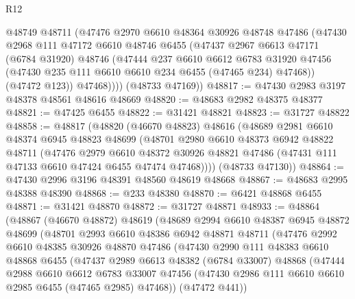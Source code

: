 \begin{lexlean}{R12}
\begin{coremodule}
          @48749
          @48711
          (@47476
            @2970
            @6610
            @48364
            @30926
            @48748
            @47486
            (@47430
              @2968
              @111
              @47172
              @6610
              @48746
              @6455
              (@47437
                @2967
                @6613
                @47171
                (@6784 @31920)
                @48746
                (@47444
                  @237
                  @6610
                  @6612
                  @6783
                  @31920
                  @47456
                  (@47430 @235 @111 @6610 @6610 @234 @6455 (@47465 @234) @47468))
                (@47472 @123))
              @47468))))
      (@48733 @47169))
@48817 := @47430 @2983 @3197 @48378 @48561 @48616 @48669
@48820 := @48683 @2982 @48375 @48377
@48821 := @47425 @6455
@48822 := @31421 @48821
@48823 := @31727 @48822
@48858 := @48817
    (@48820
      (@46670 @48823)
      @48616
      (@48689
        @2981
        @6610
        @48374
        @6945
        @48823
        @48699
        (@48701
          @2980
          @6610
          @48373
          @6942
          @48822
          @48711
          (@47476
            @2979
            @6610
            @48372
            @30926
            @48821
            @47486
            (@47431 @111 @47133 @6610 @47424 @6455 @47474 @47468))))
      (@48733 @47130))
@48864 := @47430 @2996 @3196 @48391 @48560 @48619 @48668
@48867 := @48683 @2995 @48388 @48390
@48868 := @233 @48380
@48870 := @6421 @48868 @6455
@48871 := @31421 @48870
@48872 := @31727 @48871
@48933 := @48864
    (@48867
      (@46670 @48872)
      @48619
      (@48689
        @2994
        @6610
        @48387
        @6945
        @48872
        @48699
        (@48701
          @2993
          @6610
          @48386
          @6942
          @48871
          @48711
          (@47476
            @2992
            @6610
            @48385
            @30926
            @48870
            @47486
            (@47430
              @2990
              @111
              @48383
              @6610
              @48868
              @6455
              (@47437
                @2989
                @6613
                @48382
                (@6784 @33007)
                @48868
                (@47444
                  @2988
                  @6610
                  @6612
                  @6783
                  @33007
                  @47456
                  (@47430 @2986 @111 @6610 @6610 @2985 @6455 (@47465 @2985) @47468))
                (@47472 @441))

\end{coremodule}
\end{lexlean}
